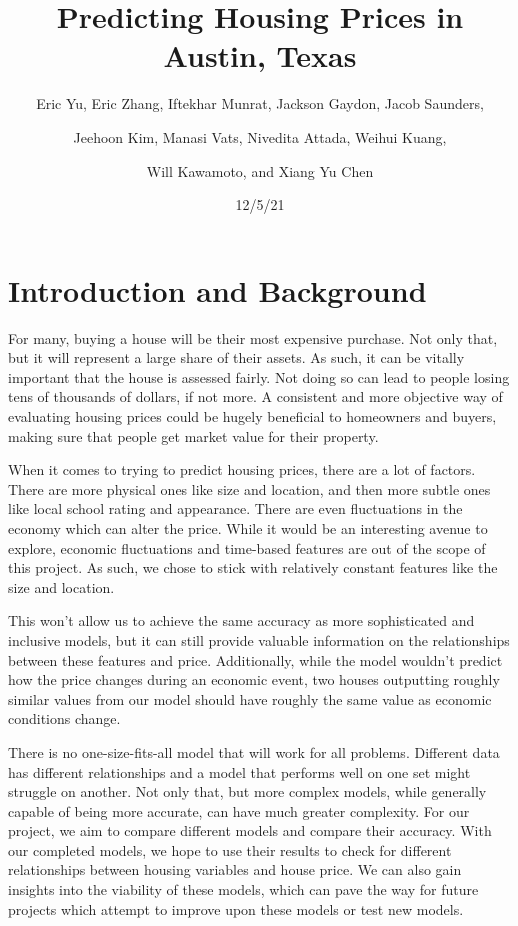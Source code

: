 \documentclass[12pt]{article}
\begin{document}
	\title{Predicting Housing Prices in Austin, Texas}
	\author{\small{Eric Yu, Eric Zhang, Iftekhar Munrat, Jackson Gaydon, Jacob Saunders,} \and \small{Jeehoon Kim, Manasi Vats, Nivedita Attada, Weihui Kuang,} \and \small{Will Kawamoto, and Xiang Yu Chen}}
	\date{12/5/21} 
	\maketitle
	
	\section{Introduction and Background} 
	
	For many, buying a house will be their most expensive purchase. Not only that, but it will represent a large share of their assets. As such, it can be vitally important that the house is assessed fairly. Not doing so can lead to people losing tens of thousands of dollars, if not more. A consistent and more objective way of evaluating housing prices could be hugely beneficial to homeowners and buyers, making sure that people get market value for their property.
	
	When it comes to trying to predict housing prices, there are a lot of factors. There are more physical ones like size and location, and then more subtle ones like local school rating and appearance. There are even fluctuations in the economy which can alter the price. While it would be an interesting avenue to explore, economic fluctuations and time-based features are out of the scope of this project. As such, we chose to stick with relatively constant features like the size and location.
	
	This won’t allow us to achieve the same accuracy as more sophisticated and inclusive models, but it can still provide valuable information on the relationships between these features and price. Additionally, while the model wouldn’t predict how the price changes during an economic event, two houses outputting roughly similar values from our model should have roughly the same value as economic conditions change. 
	
	There is no one-size-fits-all model that will work for all problems. Different data has different relationships and a model that performs well on one set might struggle on another. Not only that, but more complex models, while generally capable of being more accurate, can have much greater complexity. For our project, we aim to compare different models and compare their accuracy. With our completed models, we hope to use their results to check for different relationships between housing variables and house price. We can also gain insights into the viability of these models, which can pave the way for future projects which attempt to improve upon these models or test new models.
	
\end{document}
